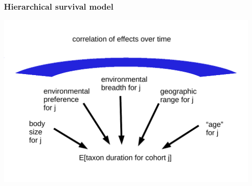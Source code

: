 \documentclass{beamer}
\begin{document}
\begin{frame}
  \frametitle{Hierarchical survival model}
  \begin{center}
    \includegraphics[width = \textwidth,height = 0.8\textheight,keepaspectratio = true]{figure/simple_model}
  \end{center}
\end{frame}
\end{document}

